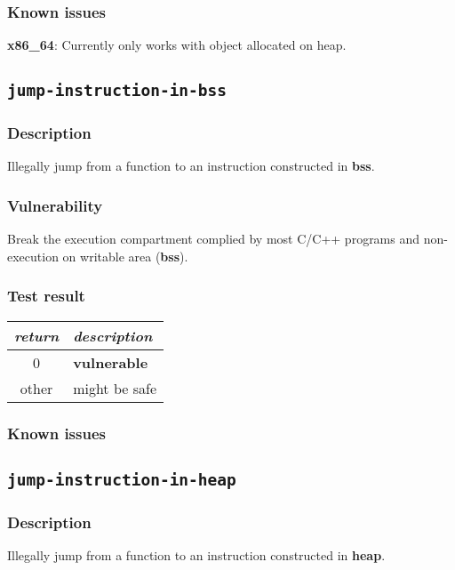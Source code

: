 \documentclass[a4paper]{book}
\begin{document}
\subsubsection{Known issues}

\textbf{x86\_64}: Currently only works with object allocated on heap.
\newpage
\subsection{\texttt{jump-instruction-in-bss}}\label{test-jump-instruction-in-bss}

\subsubsection{Description}
Illegally jump from a function to an instruction constructed in \textbf{bss}.

\subsubsection{Vulnerability}
Break the execution compartment complied by most C/C++ programs and non-execution on writable area (\textbf{bss}).

\subsubsection{Test result}
\begin{tabular}{cl}
  \toprule
  \emph{return}  & \emph{description} \\
  \midrule
  0              & \textbf{vulnerable} \\
  other          & might be safe \\
  \bottomrule
\end{tabular}
  
\subsubsection{Known issues}


\newpage
\subsection{\texttt{jump-instruction-in-heap}}\label{test-jump-instruction-in-heap}

\subsubsection{Description}
Illegally jump from a function to an instruction constructed in \textbf{heap}.
\end{document}
